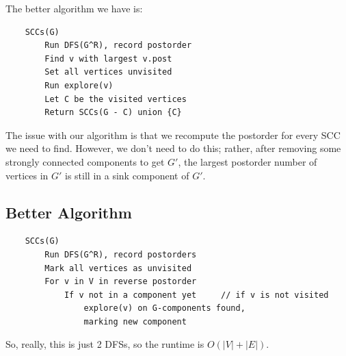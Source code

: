 \documentclass[letterpaper]{article}
\begin{document}
The better algorithm we have is: 
\begin{verbatim}
    SCCs(G)
        Run DFS(G^R), record postorder 
        Find v with largest v.post 
        Set all vertices unvisited 
        Run explore(v)
        Let C be the visited vertices 
        Return SCCs(G - C) union {C}
\end{verbatim}

The issue with our algorithm is that we recompute the postorder for every SCC we need to find. However, we don't need to do this; rather, after removing some strongly connected components to get $G'$, the largest postorder number of vertices in $G'$ is still in a sink component of $G'$. 

\subsection{Better Algorithm}
\begin{verbatim}
    SCCs(G)
        Run DFS(G^R), record postorders
        Mark all vertices as unvisited 
        For v in V in reverse postorder 
            If v not in a component yet     // if v is not visited 
                explore(v) on G-components found,
                marking new component 
\end{verbatim}

So, really, this is just 2 DFSs, so the runtime is $O(|V| + |E|)$. 

















\newpage 
\end{document}
